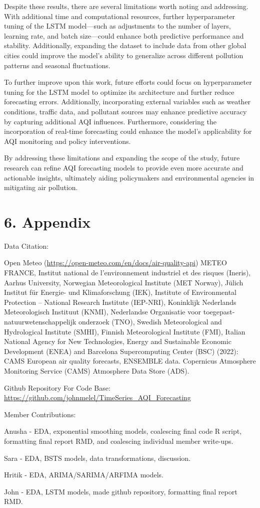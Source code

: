 \documentclass[
  12pt,
]{article}
\begin{document}
Despite these results, there are several limitations worth noting and
addressing. With additional time and computational resources, further
hyperparameter tuning of the LSTM model---such as adjustments to the
number of layers, learning rate, and batch size---could enhance both
predictive performance and stability. Additionally, expanding the
dataset to include data from other global cities could improve the
model's ability to generalize across different pollution patterns and
seasonal fluctuations.

To further improve upon this work, future efforts could focus on
hyperparameter tuning for the LSTM model to optimize its architecture
and further reduce forecasting errors. Additionally, incorporating
external variables such as weather conditions, traffic data, and
pollutant sources may enhance predictive accuracy by capturing
additional AQI influences. Furthermore, considering the incorporation of
real-time forecasting could enhance the model's applicability for AQI
monitoring and policy interventions.

By addressing these limitations and expanding the scope of the study,
future research can refine AQI forecasting models to provide even more
accurate and actionable insights, ultimately aiding policymakers and
environmental agencies in mitigating air pollution.

\section{6. Appendix}\label{appendix}

Data Citation:

Open Meteo (\url{https://open-meteo.com/en/docs/air-quality-api}) METEO
FRANCE, Institut national de l'environnement industriel et des risques
(Ineris), Aarhus University, Norwegian Meteorological Institute (MET
Norway), Jülich Institut für Energie- und Klimaforschung (IEK),
Institute of Environmental Protection -- National Research Institute
(IEP-NRI), Koninklijk Nederlands Meteorologisch Instituut (KNMI),
Nederlandse Organisatie voor toegepast-natuurwetenschappelijk onderzoek
(TNO), Swedish Meteorological and Hydrological Institute (SMHI), Finnish
Meteorological Institute (FMI), Italian National Agency for New
Technologies, Energy and Sustainable Economic Development (ENEA) and
Barcelona Supercomputing Center (BSC) (2022): CAMS European air quality
forecasts, ENSEMBLE data. Copernicus Atmosphere Monitoring Service
(CAMS) Atmosphere Data Store (ADS).

Github Repository For Code Base:
\url{https://github.com/johnmelel/TimeSeries_AQI_Forecasting}

Member Contributions:

Anusha - EDA, exponential smoothing models, coalescing final code R
script, formatting final report RMD, and coalescing individual member
write-ups.

Sara - EDA, BSTS models, data transformations, discussion.

Hritik - EDA, ARIMA/SARIMA/ARFIMA models.

John - EDA, LSTM models, made github repository, formatting final report
RMD.
\end{document}
